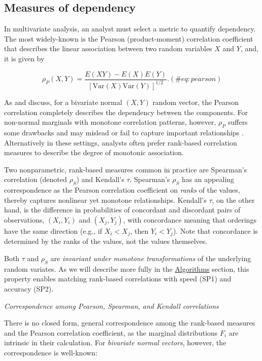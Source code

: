 \documentclass[
]{jss}
\begin{document}
\hypertarget{measures-of-dependency}{%
\subsection{Measures of dependency}\label{measures-of-dependency}}

In multivariate analysis, an analyst must select a metric to quantify
dependency. The most widely-known is the Pearson (product-moment)
correlation coefficient that describes the linear association between
two random variables \(X\) and \(Y\), and, it is given by

\begin{equation}
\rho_P(X,Y) = \frac{E(XY) - E(X)E(Y)}{\left[ \mathrm{Var}(X)\mathrm{Var}(Y)\right]^{1/2}}.
(\#eq:pearson)
\end{equation}

As \citet{MB13} and \citet{MK01} discuss, for a bivariate normal
\((X,Y)\) random vector, the Pearson correlation completely describes
the dependency between the components. For non-normal marginals with
monotone correlation patterns, however, \(\rho_P\) suffers some
drawbacks and may mislead or fail to capture important relationships
\citep{MK01}. Alternatively in these settings, analysts often prefer
rank-based correlation measures to describe the degree of monotonic
association.

Two nonparametric, rank-based measures common in practice are Spearman's
correlation (denoted \(\rho_S\)) and Kendall's \(\tau\). Spearman's
\(\rho_S\) has an appealing correspondence as the Pearson correlation
coefficient on \emph{ranks} of the values, thereby captures nonlinear
yet monotone relationships. Kendall's \(\tau\), on the other hand, is
the difference in probabilities of concordant and discordant pairs of
observations, \((X_i, Y_i)\) and \((X_j, Y_j)\), with concordance
meaning that orderings have the same direction (e.g., if \(X_i < X_j\),
then \(Y_i < Y_j\)). Note that concordance is determined by the ranks of
the values, not the values themselves.

Both \(\tau\) and \(\rho_S\) are \emph{invariant under monotone
transformations} of the underlying random variates. As we will describe
more fully in the \protect\hyperlink{algorithms}{Algorithms} section,
this property enables matching rank-based correlations with speed (SP1)
and accuracy (SP2).

\emph{Correspondence among Pearson, Spearman, and Kendall correlations}

There is no closed form, general correspondence among the rank-based
measures and the Pearson correlation coefficient, as the marginal
distributions \(F_i\) are intrinsic in their calculation. For
\emph{bivariate normal vectors}, however, the correspondence is
well-known:
\end{document}
